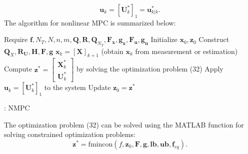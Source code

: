 \documentclass{article}
\begin{document}
\begin{equation}
    \textbf{u}_{k}=[\textbf{U}_{k}^{*}]_{1}=\textbf{u}_{k|k}^{*}.
\end{equation}
The algorithm for nonlinear MPC is summarized below:
\begin{algorithm}[H]
 \small
	\begin{algorithmic}[1] 
	
	\STATE Require $\textbf{f},N_{T},N,n,m,\textbf{Q},\textbf{R},\textbf{Q}_{N_T},\textbf{F}_{\textbf{x}},\textbf{g}_{\textbf{x}},\textbf{F}_{\textbf{u}},\textbf{g}_{\textbf{u}}$
		\STATE Initialize $\textbf{x}_{0},\textbf{z}_{0}$
		\STATE Construct $\textbf{Q}_{X},\textbf{R}_{\textbf{U}},\textbf{H},\textbf{F},\textbf{g}$
		\STATE $\textbf{x}_{k}=[\textbf{X}]_{k+1}$ (obtain $\textbf{x}_{k}$ from measurement or estimation)
		\STATE  Compute $\textbf{z}^{*}=\left[\begin{matrix}\textbf{X}_{k}^{*}\\\textbf{U}_{k}^{*}\end{matrix}\right]$ by solving the optimization problem (32)
		\STATE Apply  $\textbf{u}_{k}=[\textbf{U}_{k}^{*}]_{1}$ to the system
		\STATE Update $\textbf{z}_{0}=\textbf{z}^{*}$
		\ENDFOR
	\end{algorithmic}
	\caption{: NMPC}
\end{algorithm}
The optimization problem (32) can be solved using the MATLAB function for solving constrained optimization problems:
    \begin{equation}
        \textbf{z}^{*}=\mbox{fmincon}(f,\textbf{z}_{0},\textbf{F},\textbf{g},\textbf{lb},\textbf{ub},\textbf{f}_{eq}).
    \end{equation}
\end{document}

